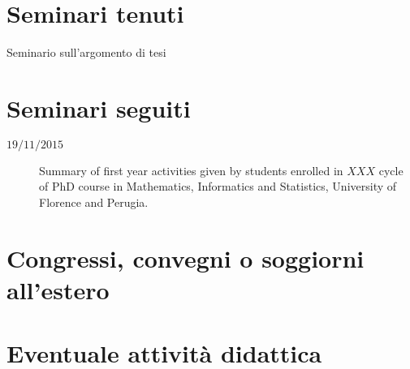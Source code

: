 \documentclass[11pt]{article}
\begin{document}
\section*{Seminari tenuti}

\begin{description}

\item[%
] 

\item[%
Seminario sull'argomento di tesi] 


\end{description}



\section*{Seminari seguiti}

\begin{description}

    \item[$19/11/2015$] Summary of first year activities given by students enrolled in $XXX$ cycle of PhD
        course in Mathematics, Informatics and Statistics, University of Florence and Perugia.

\end{description}


\section*{Congressi, convegni o soggiorni all'estero}

\begin{description}

\item[%
] 

\end{description}


\section*{Eventuale attivit\`a didattica}

\begin{description}

\item[%
] 

\end{description}
\end{document}
